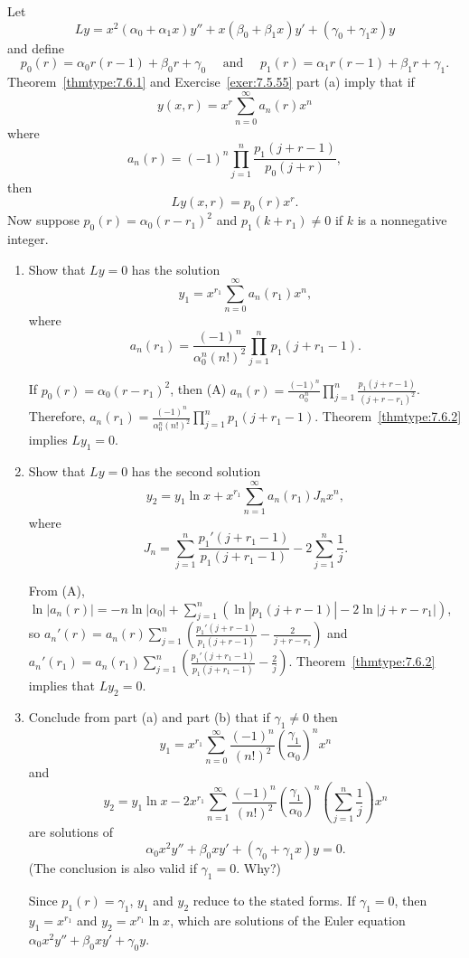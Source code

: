 \documentclass{ximera}
\begin{document}
\begin{problem}\label{exer:7.6.54}
Let
$$
Ly=x^2(\alpha_0+\alpha_1x)y''+x(\beta_0+\beta_1x)y'+(\gamma_0+\gamma_1x)y
$$
and define
$$
p_0(r)=\alpha_0r(r-1)+\beta_0r+\gamma_0\quad\mbox{ and }\quad
p_1(r)=\alpha_1r(r-1)+\beta_1r+\gamma_1.
$$
Theorem~\ref{thmtype:7.6.1}  and Exercise~\ref{exer:7.5.55} part (a)
imply that if
$$
y(x,r)=x^r\sum_{n=0}^\infty a_n(r)x^n
$$
where
$$
a_n(r)=(-1)^n\prod_{j=1}^n\frac{p_1(j+r-1)}{ p_0(j+r)},
$$
then
$$
Ly(x,r)=p_0(r)x^r.
$$
Now suppose
$p_0(r)=\alpha_0(r-r_1)^2$ and $p_1(k+r_1)\neq 0$ if $k$
is a nonnegative integer.
\begin{enumerate}
\item %
Show that $Ly=0$ has the solution
$$
y_1=x^{r_1}\sum_{n=0}^\infty a_n(r_1)x^n,
$$
where
$$
a_n(r_1)=\frac{(-1)^n}{\alpha_0^n(n!)^2}\prod_{j=1}^np_1(j+r_1-1).
$$

\begin{solution}
    If $p_0(r)=\alpha_0(r-r_1)^2$, then
(A) $a_n(r)=\frac{(-1)^n}{\alpha_0^n}
\prod_{j=1}^n\frac{p_1(j+r-1)}{(j+r-r_1)^2}$.
Therefore,
$a_n(r_1)=\frac{(-1)^n}{\alpha_0^n(n!)^2}\prod_{j=1}^np_1(j+r_1-1)$.
Theorem~\ref{thmtype:7.6.2}  implies  $Ly_1=0$.
\end{solution}

\item %
Show that $Ly=0$ has the second solution
$$
y_2=y_1\ln x+x^{r_1}\sum_{n=1}^\infty a_n(r_1)J_nx^n,
$$
where
$$
J_n=\sum_{j=1}^n\frac{p_1'(j+r_1-1)}{ p_1(j+r_1-1)}-2\sum_{j=1}^n\frac{1}{ j}.
$$

\begin{solution}
    From (A),
$\ln|a_n(r)|=-n\ln|\alpha_0|+\sum_{j=1}^n\left(\ln|p_1(j+r-1)|
-2\ln|j+r-r_1|\right)$, so
$a_n'(r)=a_n(r)\sum_{j=1}^n\left(\frac{p_1'(j+r-1)}{
p_1(j+r-1)}-\frac{2}{ j+r-r_1}\right)$ and
$a_n'(r_1)=a_n(r_1)\sum_{j=1}^n\left(\frac{p_1'(j+r_1-1)}{
p_1(j+r_1-1)}-\frac{2}{ j}\right)$.
Theorem~\ref{thmtype:7.6.2}  implies that $Ly_2=0$.
\end{solution}

\item %
Conclude from part (a) and part (b) that if
 $\gamma_1\neq 0$ then
$$
y_1=x^{r_1}\sum_{n=0}^\infty
\frac{(-1)^n}{(n!)^2}\left(\frac{\gamma_1}{\alpha_0}\right)^nx^n
$$
and
$$
y_2=y_1\ln x-2x^{r_1}\sum_{n=1}^\infty
\frac{(-1)^n}{(n!)^2}\left(\frac{\gamma_1}{\alpha_0}\right)^n
\left(\sum_{j=1}^n\frac{1}{ j}\right)x^n
$$
are solutions of
$$
\alpha_0x^2y''+\beta_0xy'+(\gamma_0+\gamma_1x)y=0.
$$
(The conclusion is also valid if $\gamma_1=0$. Why?)

\begin{solution}
    Since $p_1(r)=\gamma_1$, $y_1$ and $y_2$ reduce to the
stated forms.  If $\gamma_1=0$, then $y_1=x^{r_1}$ and $y_2=x^{r_1}\ln
x$, which are solutions of the Euler equation $\alpha_0
x^2y''+\beta_0 xy'+\gamma_0 y$.
\end{solution}
\end{enumerate}
\end{problem}
\end{document}
